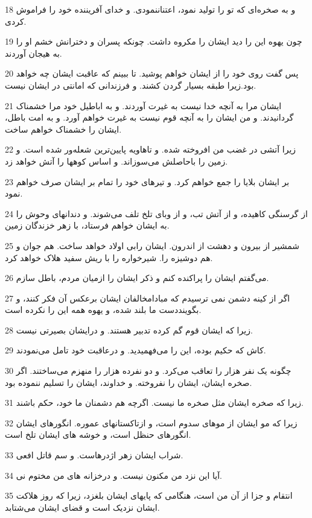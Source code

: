 \par 18 و به صخره‌ای که تو را تولید نمود، اعتناننمودی. و خدای آفریننده خود را فراموش کردی.
\par 19 چون یهوه این را دید ایشان را مکروه داشت. چونکه پسران و دخترانش خشم او را به هیجان آوردند.
\par 20 پس گفت روی خود را از ایشان خواهم پوشید. تا ببینم که عاقبت ایشان چه خواهد بود.زیرا طبقه بسیار گردن کشند. و فرزندانی که امانتی در ایشان نیست.
\par 21 ایشان مرا به آنچه خدا نیست به غیرت آوردند. و به اباطیل خود مرا خشمناک گردانیدند. و من ایشان را به آنچه قوم نیست به غیرت خواهم آورد. و به امت باطل، ایشان را خشمناک خواهم ساخت.
\par 22 زیرا آتشی در غضب من افروخته شده. و تاهاویه پایین‌ترین شعله‌ور شده است. و زمین را باحاصلش می‌سوزاند. و اساس کوهها را آتش خواهد زد.
\par 23 بر ایشان بلایا را جمع خواهم کرد. و تیرهای خود را تمام بر ایشان صرف خواهم نمود.
\par 24 از گرسنگی کاهیده، و از آتش تب، و از وبای تلخ تلف می‌شوند. و دندانهای وحوش را به ایشان خواهم فرستاد، با زهر خزندگان زمین.
\par 25 شمشیر از بیرون و دهشت از اندرون. ایشان رابی اولاد خواهد ساخت. هم جوان و هم دوشیزه را. شیرخواره را با ریش سفید هلاک خواهد کرد.
\par 26 می‌گفتم ایشان را پراکنده کنم و ذکر ایشان را ازمیان مردم، باطل سازم.
\par 27 اگر از کینه دشمن نمی ترسیدم که مبادامخالفان ایشان برعکس آن فکر کنند، و بگوینددست ما بلند شده، و یهوه همه این را نکرده است.
\par 28 زیرا که ایشان قوم گم کرده تدبیر هستند. و درایشان بصیرتی نیست.
\par 29 کاش که حکیم بوده، این را می‌فهمیدید. و درعاقبت خود تامل می‌نمودند.
\par 30 چگونه یک نفر هزار را تعاقب می‌کرد. و دو نفرده هزار را منهزم می‌ساختند. اگر صخره ایشان، ایشان را نفروخته. و خداوند، ایشان را تسلیم ننموده بود.
\par 31 زیرا که صخره ایشان مثل صخره ما نیست. اگرچه هم دشمنان ما خود، حکم باشند.
\par 32 زیرا که مو ایشان از موهای سدوم است، و ازتاکستانهای عموره. انگورهای ایشان انگورهای حنظل است، و خوشه های ایشان تلخ است.
\par 33 شراب ایشان زهر اژدرهاست. و سم قاتل افعی.
\par 34 آیا این نزد من مکنون نیست. و درخزانه های من مختوم نی.
\par 35 انتقام و جزا از آن من است، هنگامی که پایهای ایشان بلغزد، زیرا که روز هلاکت ایشان نزدیک است و قضای ایشان می‌شتابد.
